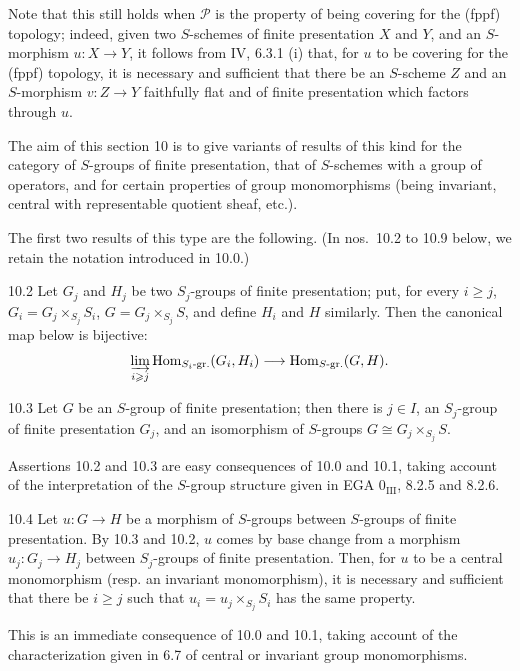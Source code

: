Note that this still holds when $\mathscr P$ is the property of being covering for the (fppf) topology; indeed, given two $S$-schemes of finite presentation $X$ and $Y$, and an $S$-morphism $u:X\to Y$, it follows from IV, 6.3.1 (i) that, for $u$ to be covering for the (fppf) topology, it is necessary and sufficient that there be an $S$-scheme $Z$ and an $S$-morphism $v:Z\to Y$ faithfully flat and of finite presentation which factors through $u$.

The aim of this section 10 is to give variants of results of this kind for the category of $S$-groups of finite presentation, that of $S$-schemes with a group of operators, and for certain properties of group monomorphisms (being invariant, central with representable quotient sheaf, etc.).

The first two results of this type are the following. (In nos.\ 10.2 to 10.9 below, we retain the notation introduced in 10.0.)

\begin{lemma}{10.2}\label{VIB.10.2}
Let $G_j$ and $H_j$ be two $S_j$-groups of finite presentation; put, for every $i\geq j$, $G_i=G_j\times_{S_j}S_i$, $G=G_j\times_{S_j}S$, and define $H_i$ and $H$ similarly. Then the canonical map below is bijective:
\[
\varinjlim_{i\geqslant j}\operatorname{Hom}_{S_i\text{-gr.}}(G_i,H_i)\longrightarrow\operatorname{Hom}_{S\text{-gr.}}(G,H).
\]
\end{lemma}
\begin{lemma}{10.3}\label{VIB.10.3}
Let $G$ be an $S$-group of finite presentation; then there is $j\in I$, an $S_j$-group of finite presentation $G_j$, and an isomorphism of $S$-groups $G\cong G_j\times_{S_j}S$.
\end{lemma}
Assertions 10.2 and 10.3 are easy consequences of 10.0 and 10.1, taking account of the interpretation of the $S$-group structure given in EGA 0$_{\mathrm{III}}$, 8.2.5 and 8.2.6.

\begin{lemma}{10.4}\label{VIB.10.4}
Let $u:G\to H$ be a morphism of $S$-groups between $S$-groups of finite presentation. By 10.3 and 10.2, $u$ comes by base change from a morphism $u_j:G_j\to H_j$ between $S_j$-groups of finite presentation. Then, for $u$ to be a central monomorphism (resp. an invariant monomorphism), it is necessary and sufficient that there be $i\geq j$ such that $u_i=u_j\times_{S_j}S_i$ has the same property.
\end{lemma}
This is an immediate consequence of 10.0 and 10.1, taking account of the characterization given in 6.7 of central or invariant group monomorphisms.

